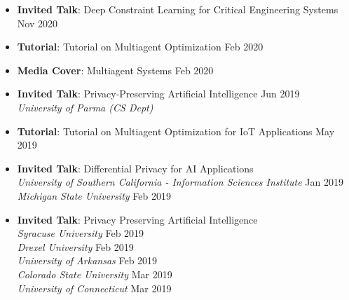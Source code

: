 \begin{itemize}

  \item {\bf Invited Talk}: Deep Constraint Learning for Critical Engineering Systems \hfill {Nov 2020}\\
  
  \item {\bf Tutorial}: {Tutorial on Multiagent Optimization} \hfill {Feb 2020}\\ 
  
  \item {\bf Media Cover}: {Multiagent Systems} \hfill{Feb 2020}\\

  \item {\bf Invited Talk}:  Privacy-Preserving Artificial Intelligence \hfill {Jun 2019}\\
  {\em University of Parma (CS Dept)} 

  \item {\bf Tutorial}: {Tutorial on Multiagent Optimization for IoT Applications} \hfill {May 2019}\\ 

  \item {\bf Invited Talk}: Differential Privacy for AI Applications\\
  {\em University of Southern California - Information Sciences Institute} \hfill {Jan 2019}\\
  {\em Michigan State University} \hfill {Feb 2019}

  \item {\bf Invited Talk}: Privacy Preserving Artificial Intelligence\\
  {\em Syracuse University} \hfill {Feb 2019}\\
  {\em Drexel University} \hfill {Feb 2019}\\
  {\em University of Arkansas} \hfill {Feb 2019}\\
  {\em Colorado State University} \hfill {Mar 2019}\\
  {\em University of Connecticut} \hfill {Mar 2019}


\end{itemize}
